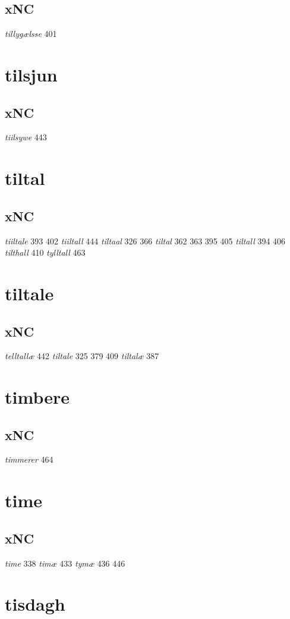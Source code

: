 \documentclass[a4paper,twocolumn]{article}
\begin{document}
\subsection{xNC}
\label{sec:orged36aee}
\emph{tillygælsse} 401 
\section{tilsjun}
\label{sec:org209143a}
\subsection{xNC}
\label{sec:org8f580c6}
\emph{tiilsywe} 443 
\section{tiltal}
\label{sec:org76ebef3}
\subsection{xNC}
\label{sec:org178314d}
\emph{tiiltale} 393 402 \emph{tiiltall} 444 \emph{tiltaal} 326 366 \emph{tiltal} 362 363 395 405 \emph{tiltall} 394 406 \emph{tilthall} 410 \emph{tylltall} 463 
\section{tiltale}
\label{sec:orgb005770}
\subsection{xNC}
\label{sec:orgc9475e8}
\emph{telltallæ} 442 \emph{tiltale} 325 379 409 \emph{tiltalæ} 387 
\section{timbere}
\label{sec:org04f0824}
\subsection{xNC}
\label{sec:org8349875}
\emph{timmerer} 464 
\section{time}
\label{sec:orgb7979f1}
\subsection{xNC}
\label{sec:orgb02bd37}
\emph{time} 338 \emph{timæ} 433 \emph{tymæ} 436 446 
\section{tisdagh}
\label{sec:org6f19a73}
\end{document}
